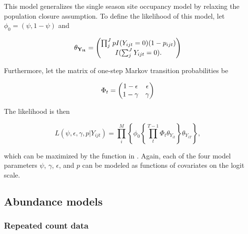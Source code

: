 \documentclass[article,shortnames]{jss}
\newcommand{\um}{\pkg{unmarked}}
\begin{document}
This model generalizes the single season site occupancy model by relaxing the 
population closure assumption. To define the likelihood of this model, 
let $\phi_0 = (\psi, 1-\psi)$ and 

\begin{equation}
  \theta_{{\bf Y_{it}}} =
  \begin{pmatrix}
    \prod_{j}^{J} p I(Y_{ijt}=0)(1-p_{ijt}) \\
    I(\sum_{j}^{J} Y_{ijt}=0). \notag\\
  \end{pmatrix}
\end{equation}

Furthermore, let the matrix of one-step Markov transition probabilities be 

\begin{equation}
  \Phi_t =
  \begin{pmatrix}
    1-\epsilon & \epsilon \\
    1-\gamma & \gamma \notag\\
  \end{pmatrix}
\end{equation}

The likelihood is then

\begin{equation}
L(\psi,\epsilon,\gamma,p | Y_{ijt}) = 
 \prod_{i}^{M} \left\{
    \phi_0 \left\{ \prod_{t}^{T-1} \Phi_t \theta_{Y_{it}}  
        \right\} \theta_{Y_{iT}} \right\},
\end{equation}

which can be maximized by the  function in \um. Again, 
each of the four model parameters $\psi$, $\gamma$, 
$\epsilon$, and $p$ can be modeled as functions of covariates on the logit 
scale. 


\subsection{Abundance models}

\subsubsection{Repeated count data}
\label{sec:repeated-count-data}
\end{document}

